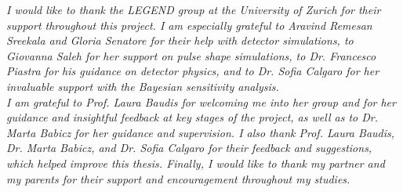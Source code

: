 \textit{
I would like to thank the LEGEND group at the University of Zurich for their support throughout this project. 
I am especially grateful to Aravind Remesan Sreekala and Gloria Senatore for their help with detector simulations, to Giovanna Saleh for her support on pulse shape simulations, to Dr. Francesco Piastra for his guidance on detector physics, and to Dr. Sofia Calgaro for her invaluable support with the Bayesian sensitivity analysis. \\
I am grateful to Prof. Laura Baudis for welcoming me into her group and for her guidance and insightful feedback at key stages of the project, as well as to Dr. Marta Babicz for her guidance and supervision. I also thank Prof. Laura Baudis, Dr. Marta Babicz, and Dr. Sofia Calgaro for their feedback and suggestions, which helped improve this thesis.
Finally, I would like to thank my partner and my parents for their support and encouragement throughout my studies.
}
